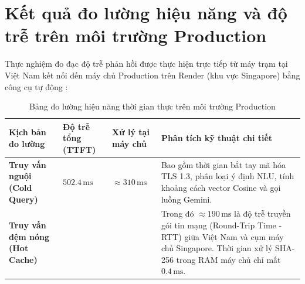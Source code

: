 \section{Kết quả đo lường hiệu năng và độ trễ trên môi trường Production}
\label{sec:performance_benchmarks}

Thực nghiệm đo đạc độ trễ phản hồi được thực hiện trực tiếp từ máy trạm tại Việt Nam kết nối đến máy chủ Production trên Render (khu vực Singapore) bằng công cụ tự động :

\begin{table}[htbp]
\centering
\small
\begin{tabularx}{\textwidth}{L{3.2cm} C{2.5cm} C{3.0cm} Y}
\toprule
\textbf{Kịch bản đo lường} & \textbf{Độ trễ tổng (TTFT)} & \textbf{Xử lý tại máy chủ} & \textbf{Phân tích kỹ thuật chi tiết} \\
\midrule
\textbf{Truy vấn nguội (Cold Query)} & $502.4\,\text{ms}$ & $\approx 310\,\text{ms}$ & Bao gồm thời gian bắt tay mã hóa TLS 1.3, phân loại ý định NLU, tính khoảng cách vector Cosine và gọi luồng Gemini. \\
\addlinespace
\textbf{Truy vấn đệm nóng (Hot Cache)} &  &  & Trong đó $\approx 190\,\text{ms}$ là độ trễ truyền gói tin mạng (Round-Trip Time - RTT) giữa Việt Nam và cụm máy chủ Singapore. Thời gian xử lý SHA-256 trong RAM máy chủ chỉ mất $0.4\,\text{ms}$. \\
\bottomrule
\end{tabularx}
\caption{Bảng đo lường hiệu năng thời gian thực trên môi trường Production}
\end{table}
